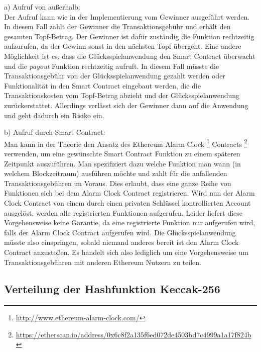 a) Aufruf von außerhalb:\\
Der Aufruf kann wie in der Implementierung vom Gewinner ausgeführt werden. In diesem Fall zahlt der Gewinner die Transaktionsgebühr und erhält den gesamten Topf-Betrag. Der Gewinner ist dafür zuständig die Funktion rechtzeitig aufzurufen, da der Gewinn sonst in den nächsten Topf übergeht. Eine andere Möglichkeit ist es, dass die Glücksspielanwendung den Smart Contract überwacht und die \textit{payout} Funktion rechtzeitig aufruft. In diesem Fall müsste die Transaktionsgebühr von der Glücksspielanwendung gezahlt werden oder Funktionalität in den Smart Contract eingebaut werden, die die Transaktionskosten vom Topf-Betrag abzieht und der Glücksspielanwendung zurückerstattet. Allerdings verlässt sich der Gewinner dann auf die Anwendung und geht dadurch ein Risiko ein.

b) Aufruf durch Smart Contract:\\
Man kann in der Theorie den Ansatz des Ethereum Alarm Clock \footnote{\url{http://www.ethereum-alarm-clock.com/}} Contracts \footnote{\url{https://etherscan.io/address/0x6c8f2a135f6ed072de4503bd7c4999a1a17f824b}} verwenden, um eine gewünschte Smart Contract Funktion zu einem späteren Zeitpunkt auszuführen. Man spezifiziert dazu welche Funktion man wann (in welchem Blockzeitraum) ausführen möchte und zahlt für die anfallenden Transaktionsgebühren im Voraus. Dies erlaubt, dass eine ganze Reihe von Funktionen sich bei dem Alarm Clock Contract registrieren. Wird nun der Alarm Clock Contract von einem durch einen privaten Schlüssel kontrollierten Account ausgelöst, werden alle registrierten Funktionen aufgerufen. Leider liefert diese Vorgehensweise keine  Garantie, da eine registrierte Funktion nur aufgerufen wird, falls der Alarm Clock Contract aufgerufen wird. Die Glücksspielanwendung müsste also einspringen, sobald niemand anderes bereit ist den Alarm Clock Contract anzustoßen. Es handelt sich also lediglich um eine Vorgehensweise um Transaktionsgebühren mit anderen Ethereum Nutzern zu teilen.

\subsection{Verteilung der Hashfunktion Keccak-256}\label{eth_distribution}

